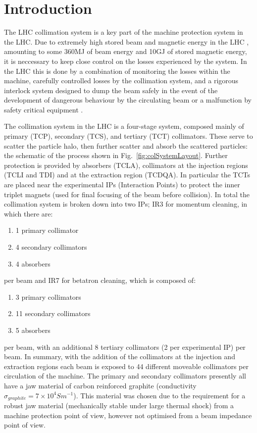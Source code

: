 \label{chap:ColImp}
\section{Introduction}

The LHC collimation system is a key part of the machine protection system in the LHC. Due to extremely high stored beam and magnetic energy in the LHC \cite{Schmidt:LHCMP}, amounting to some 360MJ of beam energy and 10GJ of stored magnetic energy, it is neccessary to keep close control on the losses experienced by the system. In the LHC this is done by a combination of monitoring the losses within the machine, carefully controlled losses by the collimation system, and a rigorous interlock system designed to dump the beam safely in the event of the development of dangerous behaviour by the circulating beam or a malfunction by safety critical equipment \cite{Schmidt:LHCMP}.

The collimation system in the LHC is a four-stage system, composed mainly of primary (TCP), secondary (TCS), and tertiary (TCT) collimators. These serve to scatter the particle halo, then further scatter and absorb the scattered particles: the schematic of the process shown in Fig.~\ref{fig:colSystemLayout}. Further protection is provided by absorbers (TCLA), collimators at the injection regions (TCLI and TDI) and at the extraction region (TCDQA). In particular the TCTs are placed near the experimental IPs (Interaction Points) to protect the inner triplet magnets (used for final focusing of the beam before collision). In total the collimation system is broken down into two IPs; IR3 for momentum cleaning, in which there are:

\begin{enumerate}
\item{1 primary collimator}
\item{4 secondary collimators}
\item{4 absorbers}
\end{enumerate}

per beam and IR7 for betatron cleaning, which is composed of:

\begin{enumerate}
\item{3 primary collimators}
\item{11 secondary collimators}
\item{5 absorbers}
\end{enumerate}

per beam, with an additional 8 tertiary collimators (2 per experimental IP) per beam. In summary, with the addition of the collimators at the injection and extraction regions each beam is exposed to 44 different moveable collimators per circulation of the machine. The primary and secondary collimators presently all have a jaw material of carbon reinforced graphite (conductivity $\sigma_{graphite} = 7 \times 10^{4} S m^{-1} $). This material was chosen due to the requirement for a robust jaw material (mechanically stable under large thermal shock) from a machine protection point of view, however not optimised from a beam impedance point of view.

